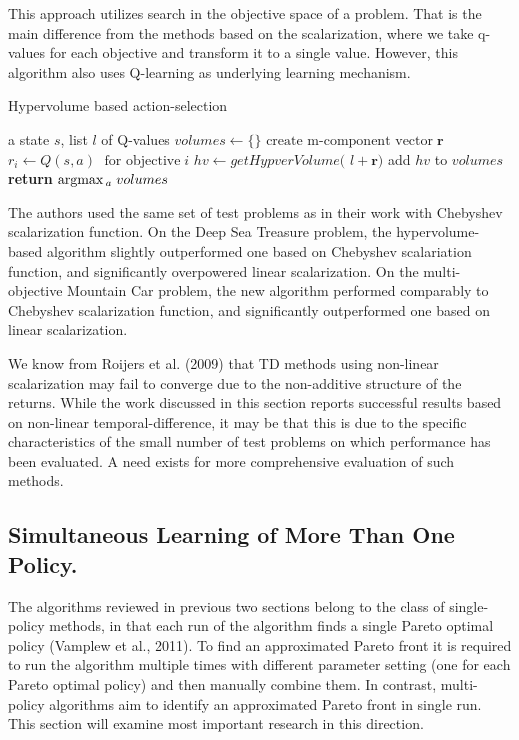 This approach utilizes search in the objective space of a problem. That is the main difference from the methods based on the scalarization, where we take q-values for each objective and transform it to a single value. However, this algorithm also uses Q-learning as underlying learning mechanism.

\begin{algorithm}[tb]
   \caption{Hypervolume based action-selection}
   \label{alg:hb-as}
\begin{algorithmic}
    a state $s$, list $l$ of Q-values
   \STATE  $volumes \leftarrow \{\} $
       \STATE  $ \text{create m-component vector}\; \textbf{r} $
       \STATE  $ r_{i} \leftarrow Q(s,a)\; \text{ for objective}\;i  $
       \ENDFOR
       \STATE $ hv \leftarrow \textit{getHypverVolume( l} + \textbf{r} \textit{)} $  \STATE add $hv$ to $volumes$
   \ENDFOR
   \STATE \textbf{return} $ \mbox{argmax}\,_{a}\; volumes $
\end{algorithmic}
\end{algorithm}

The authors used the same set of test problems as in their work with Chebyshev scalarization function. On the Deep Sea Treasure problem, the hypervolume-based algorithm slightly outperformed one based on Chebyshev scalariation function, and significantly overpowered linear scalarization. On the multi-objective Mountain Car problem, the new algorithm performed comparably to Chebyshev scalarization function, and significantly outperformed one based on linear scalarization.

We know from Roijers et al. (2009)\nocite{roijers2013survey} that TD methods using non-linear scalarization may fail to converge due to the non-additive structure of the returns. While the work discussed in this section reports successful results based on non-linear temporal-difference, it may be that this is due to the specific characteristics of the small number of test problems on which performance has been evaluated. A need exists for more comprehensive evaluation of such methods.

\subsection{Simultaneous Learning of More Than One Policy.}

The algorithms reviewed in previous two sections belong to the class of single-policy methods, in that each run of the algorithm finds a single Pareto optimal policy (Vamplew et al., 2011\nocite{vamplew2011empirical}). To find an approximated Pareto front it is required to run the algorithm multiple times with different parameter setting (one for each Pareto optimal policy) and then manually combine them. In contrast, multi-policy algorithms aim to identify an approximated Pareto front in single run. This section will examine most important research in this direction.


